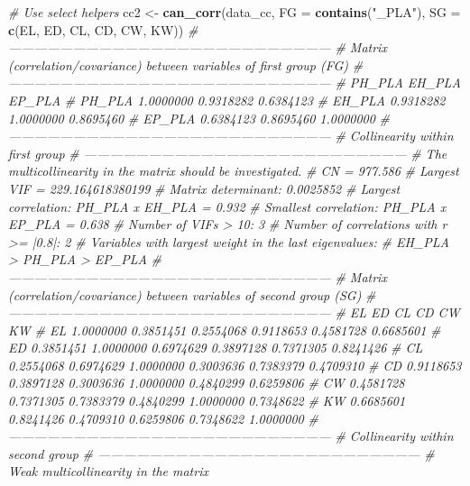 \documentclass[
]{book}
\newenvironment{Shaded}{\begin{snugshade}}{\end{snugshade}}
\newcommand{\CommentTok}[1]{\textcolor[rgb]{0.56,0.35,0.01}{\textit{#1}}}
\newcommand{\DataTypeTok}[1]{\textcolor[rgb]{0.13,0.29,0.53}{#1}}
\newcommand{\KeywordTok}[1]{\textcolor[rgb]{0.13,0.29,0.53}{\textbf{#1}}}
\newcommand{\NormalTok}[1]{#1}
\newcommand{\StringTok}[1]{\textcolor[rgb]{0.31,0.60,0.02}{#1}}
\begin{document}
\begin{Shaded}
\begin{Highlighting}[]
\CommentTok{# Use select helpers}
\NormalTok{cc2 <-}\StringTok{ }
\StringTok{  }\KeywordTok{can_corr}\NormalTok{(data_cc,}
           \DataTypeTok{FG =} \KeywordTok{contains}\NormalTok{(}\StringTok{"_PLA"}\NormalTok{),}
           \DataTypeTok{SG =} \KeywordTok{c}\NormalTok{(EL, ED, CL, CD, CW, KW))}
\CommentTok{# ---------------------------------------------------------------------------}
\CommentTok{# Matrix (correlation/covariance) between variables of first group (FG)}
\CommentTok{# ---------------------------------------------------------------------------}
\CommentTok{#           PH_PLA    EH_PLA    EP_PLA}
\CommentTok{# PH_PLA 1.0000000 0.9318282 0.6384123}
\CommentTok{# EH_PLA 0.9318282 1.0000000 0.8695460}
\CommentTok{# EP_PLA 0.6384123 0.8695460 1.0000000}
\CommentTok{# ---------------------------------------------------------------------------}
\CommentTok{# Collinearity within first group }
\CommentTok{# ---------------------------------------------------------------------------}
\CommentTok{# The multicollinearity in the matrix should be investigated.}
\CommentTok{# CN = 977.586}
\CommentTok{# Largest VIF = 229.164618380199}
\CommentTok{# Matrix determinant: 0.0025852 }
\CommentTok{# Largest correlation: PH_PLA x EH_PLA = 0.932 }
\CommentTok{# Smallest correlation: PH_PLA x EP_PLA = 0.638 }
\CommentTok{# Number of VIFs > 10: 3 }
\CommentTok{# Number of correlations with r >= |0.8|: 2 }
\CommentTok{# Variables with largest weight in the last eigenvalues: }
\CommentTok{# EH_PLA > PH_PLA > EP_PLA }
\CommentTok{# ---------------------------------------------------------------------------}
\CommentTok{# Matrix (correlation/covariance) between variables of second group (SG)}
\CommentTok{# ---------------------------------------------------------------------------}
\CommentTok{#           EL        ED        CL        CD        CW        KW}
\CommentTok{# EL 1.0000000 0.3851451 0.2554068 0.9118653 0.4581728 0.6685601}
\CommentTok{# ED 0.3851451 1.0000000 0.6974629 0.3897128 0.7371305 0.8241426}
\CommentTok{# CL 0.2554068 0.6974629 1.0000000 0.3003636 0.7383379 0.4709310}
\CommentTok{# CD 0.9118653 0.3897128 0.3003636 1.0000000 0.4840299 0.6259806}
\CommentTok{# CW 0.4581728 0.7371305 0.7383379 0.4840299 1.0000000 0.7348622}
\CommentTok{# KW 0.6685601 0.8241426 0.4709310 0.6259806 0.7348622 1.0000000}
\CommentTok{# ---------------------------------------------------------------------------}
\CommentTok{# Collinearity within second group }
\CommentTok{# ---------------------------------------------------------------------------}
\CommentTok{# Weak multicollinearity in the matrix}

\end{Highlighting}
\end{Shaded}
\end{document}
